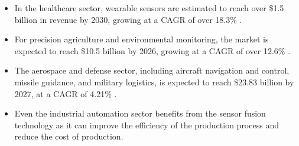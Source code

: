 \documentclass[rnd]{mas_proposal}
\begin{document}
\begin{itemize}
    \item In the healthcare sector, wearable sensors are estimated to reach over \$1.5 billion in revenue by 2030, growing at a CAGR of over 18.3\% \cite{straitsresearch2021}.

    \item For precision agriculture and environmental monitoring, the market is expected to reach \$10.5 billion by 2026, growing at a CAGR of over 12.6\% \cite{mordorintelligence2023}.

    \item The aerospace and defense sector, including aircraft navigation and control, missile guidance, and military logistics, is expected to reach \$23.83 billion by 2027, at a CAGR of 4.21\% \cite{fortunebusinessinsights2023}.

    \item Even the industrial automation sector benefits from the sensor fusion technology as it can improve the efficiency of the production process and reduce the cost of production.









\end{itemize}
\end{document}
